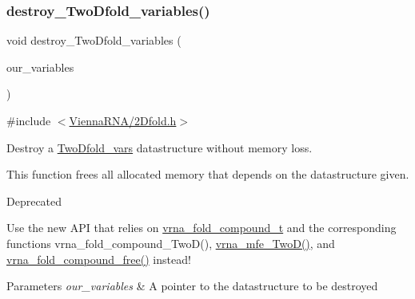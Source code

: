 \subsubsection{\texorpdfstring{destroy\+\_\+\+Two\+Dfold\+\_\+variables()}{destroy\_TwoDfold\_variables()}}
{\footnotesize\ttfamily void destroy\+\_\+\+Two\+Dfold\+\_\+variables (\begin{DoxyParamCaption}\item[{\hyperlink{group__kl__neighborhood__mfe_structTwoDfold__vars}{Two\+Dfold\+\_\+vars} $\ast$}]{our\+\_\+variables }\end{DoxyParamCaption})}



{\ttfamily \#include $<$\hyperlink{2Dfold_8h}{Vienna\+R\+N\+A/2\+Dfold.\+h}$>$}



Destroy a \hyperlink{group__kl__neighborhood__mfe_structTwoDfold__vars}{Two\+Dfold\+\_\+vars} datastructure without memory loss. 

This function free\textquotesingle{}s all allocated memory that depends on the datastructure given.

\begin{DoxyRefDesc}{Deprecated}
\item[\hyperlink{deprecated__deprecated000003}{Deprecated}]Use the new A\+PI that relies on \hyperlink{group__fold__compound_ga1b0cef17fd40466cef5968eaeeff6166}{vrna\+\_\+fold\+\_\+compound\+\_\+t} and the corresponding functions vrna\+\_\+fold\+\_\+compound\+\_\+\+Two\+D(), \hyperlink{group__kl__neighborhood__mfe_ga243c288b463147352829df04de6a2f77}{vrna\+\_\+mfe\+\_\+\+Two\+D()}, and \hyperlink{group__fold__compound_gadded6039d63f5d6509836e20321534ad}{vrna\+\_\+fold\+\_\+compound\+\_\+free()} instead!\end{DoxyRefDesc}



\begin{DoxyParams}{Parameters}
{\em our\+\_\+variables} & A pointer to the datastructure to be destroyed \\
\hline
\end{DoxyParams}
\mbox{\label{group__kl__neighborhood__mfe_ga7fc5e3e92fe97914ca4eccd33c01c2a7}} 
